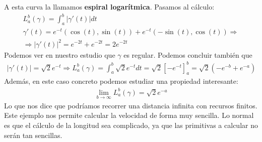 \begin{ejemplo}
\begin{enumerate}
        A esta curva la llamamos \textbf{espiral logarítmica}. Pasamos al cálculo:
        \begin{gather*}
            L_a^b(\gamma) = \int_a^b |\gamma'(t)| dt\\
            \gamma'(t) = e^{-t}(\cos(t), \sin(t)) + e^{-t}(-\sin(t), \cos(t))\Rightarrow\\
            \Rightarrow |\gamma'(t)|^2 = e^{-2t}+e^{-2t} = 2e^{-2t}
        \end{gather*}
        Podemos ver en nuestro estudio que $\gamma$ es regular. Podemos concluir también que
        \begin{gather*}
            |\gamma'(t)| = \sqrt{2}e^{-t} \Rightarrow L_a^b(\gamma) = \int_a^b \sqrt{2}e^{-t} dt = \sqrt{2}[-e^{-t}]_a^b = \sqrt{2}(-e^{-b}+e^{-a})
        \end{gather*}
        Además, en este caso concreto podemos estudiar una propiedad interesante:
        \begin{gather*}
            \lim_{b\to \infty} L_a^b(\gamma) = \sqrt{2}e^{-a}
        \end{gather*}
        Lo que nos dice que podríamos recorrer una distancia infinita con recursos finitos. Este ejemplo nos permite calcular la velocidad de forma muy sencilla. Lo normal es que el cálculo de la longitud sea complicado, ya que las primitivas a calcular no serán tan sencillas.
    \end{enumerate}
\end{ejemplo}



